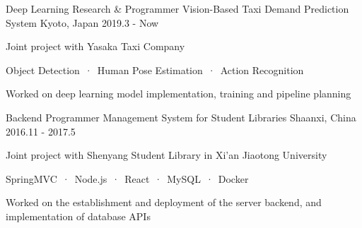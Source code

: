 

\begin{cventries}
  \cventryproject
    {Deep Learning Research \& Programmer} %
    {Vision-Based Taxi Demand Prediction System} %
    {Kyoto, Japan} %
    {2019.3 - Now} %
    {
      \begin{cvitems} %
        \item {Joint project with Yasaka Taxi Company}
        \item {Object Detection\ ·\ Human Pose Estimation\ ·\ Action Recognition}
        \item {Worked on deep learning model implementation, training and pipeline planning}
      \end{cvitems}
    }
 
  
  \cventryproject
    {Backend Programmer} %
    {Management System for Student Libraries} %
    {Shaanxi, China} %
    {2016.11 - 2017.5} %
    {
      \begin{cvitems} %
        \item {Joint project with Shenyang Student Library in Xi'an Jiaotong University}
        \item {SpringMVC\ ·\ Node.js\ ·\ React\ ·\ MySQL\ ·\ Docker}
        \item {Worked on the establishment and deployment of the server backend, and implementation of database APIs}
      \end{cvitems}
    }


\end{cventries}